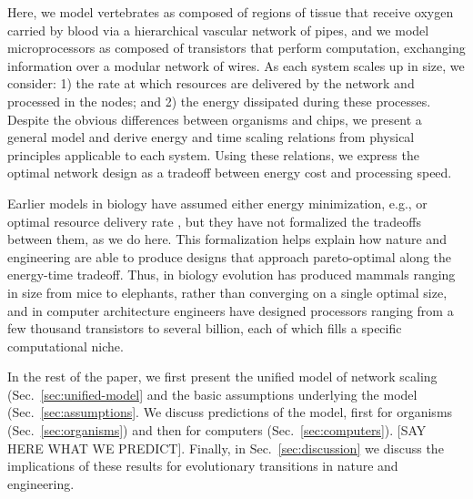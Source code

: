 \documentclass[12pt]{article}
\begin{document}
Here, we model vertebrates as composed of regions of tissue that 
receive oxygen carried by blood via a hierarchical vascular network of pipes, and we 
model microprocessors as composed of transistors that perform 
computation, exchanging information over a modular network of wires.  
As each system scales up in size, we consider: 1) the rate at which 
resources are delivered by the network and processed in the nodes; 
and 2) the energy dissipated during these processes. Despite the 
obvious differences between organisms and chips, we present a general
model and derive 
energy and time scaling relations from physical principles applicable 
to each system. Using these relations, we express the optimal network 
design as a tradeoff between energy cost and processing speed. 


Earlier models in biology have assumed either energy minimization, e.g.,
\cite{west97} or optimal resource delivery rate \cite{banavar10}, but they have
not formalized the tradeoffs between them, as we do here.  This formalization
helps explain how  nature and engineering are able to produce designs that
approach pareto-optimal along the energy-time tradeoff.  Thus, in biology
evolution has produced mammals ranging in size from mice to elephants, rather
than converging on a single optimal size, and in computer architecture
engineers have designed processors ranging from a few thousand transistors to
several billion, each of which fills a specific computational niche.

In the rest of the paper, we first present the unified model of network scaling
(Sec.~\ref{sec:unified-model} and the basic assumptions underlying the model
(Sec.~\ref{sec:assumptions}.  We discuss predictions of the model, first for
organisms (Sec.~\ref{sec:organisms}) and then for computers
(Sec.~\ref{sec:computers}). [SAY HERE WHAT WE PREDICT].  Finally, in
Sec.~\ref{sec:discussion}  we discuss the implications of these results for
evolutionary transitions in nature and engineering.
\end{document}
